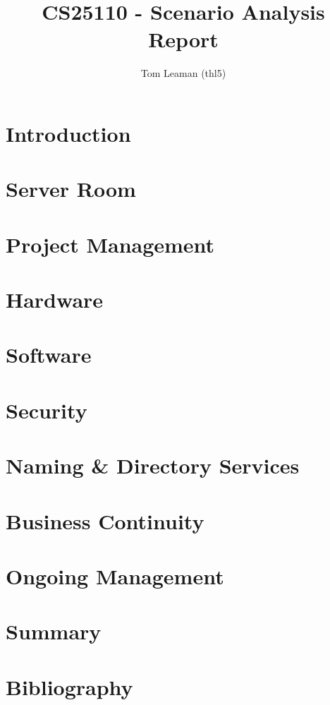 \documentclass[a4paper, twoside]{article}
\title{CS25110 - Scenario Analysis Report}
\author{Tom Leaman (thl5)}
\begin{document}
\maketitle

\section{Introduction}

\section{Server Room}

\section{Project Management}

\section{Hardware}

\section{Software}

\section{Security}

\section{Naming \& Directory Services}

\section{Business Continuity}

\section{Ongoing Management}

\section{Summary}

\section{Bibliography}
\end{document}
